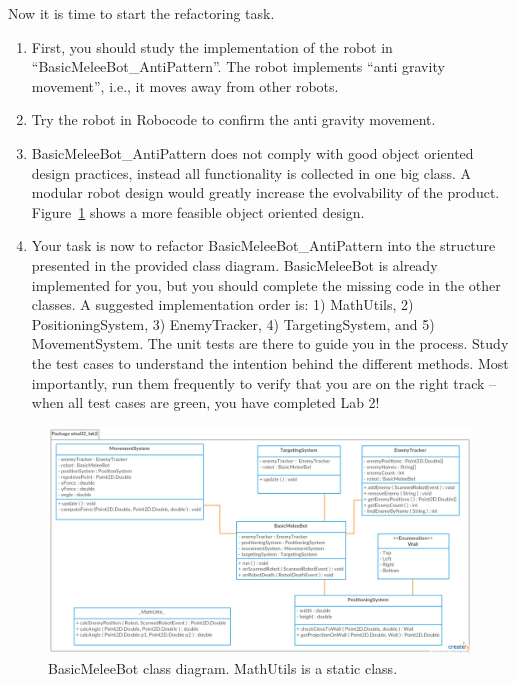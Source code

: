 \documentclass{scrreprt}
\begin{document}
Now it is time to start the refactoring task. 
\begin{enumerate}
\item First, you should study the implementation of the robot in ``BasicMeleeBot_AntiPattern''. The robot implements ``anti gravity movement'', i.e., it moves away from other robots. 
\item Try the robot in Robocode to confirm the anti gravity movement.
\item BasicMeleeBot_AntiPattern does not comply with good object oriented design practices, instead all functionality is collected in one big class. A modular robot design would greatly increase the evolvability of the product. Figure~\ref{fig:classDiagram} shows a more feasible object oriented design. 
\item Your task is now to refactor BasicMeleeBot_AntiPattern into the structure presented in the provided class diagram. BasicMeleeBot is already implemented for you, but you should complete the missing code in the other classes. A suggested implementation order is: 1) MathUtils, 2) PositioningSystem, 3) EnemyTracker, 4) TargetingSystem, and 5) MovementSystem. The unit tests are there to guide you in the process. Study the test cases to understand the intention behind the different methods. Most importantly, run them frequently to verify that you are on the right track -- when all test cases are green, you have completed Lab 2!
\end{enumerate}

\begin{figure}
\centering
\includegraphics[width=1.1\textwidth]{figures/BasicMeleeBotClassDiagram.png}
\caption{BasicMeleeBot class diagram. MathUtils is a static class.}
\label{fig:classDiagram}
\end{figure}
\end{document}
